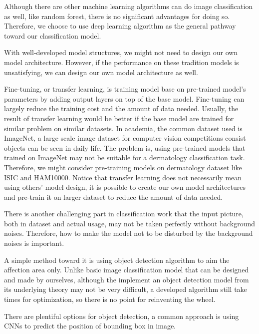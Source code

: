                     Although there are other machine learning algorithms can do image classification as well, like random forest, there is no significant advantages for doing so. Therefore, we choose to use deep learning algorithm as the general pathway toward our classification model.

                    With well-developed model structures, we might not need to design our own model architecture. However, if the performance on these tradition models is unsatisfying, we can design our own model architecture as well.

                    Fine-tuning, or transfer learning, is training model base on pre-trained model's parameters by adding output layers on top of the base model. Fine-tuning can largely reduce the training cost and the amount of data needed. Usually, the result of transfer learning would be better if the base model are trained for similar problem on similar datasets. In academia, the common dataset used is ImageNet\cite{imagenet_cvpr09}, a large scale image dataset for computer vision competitions consist objects can be seen in daily life. The problem is, using pre-trained models that trained on ImageNet may not be suitable for a dermatology classification task. Therefore, we might consider pre-training models on dermatology dataset like ISIC and HAM10000. Notice that transfer learning does not necessarily mean using others' model design, it is possible to create our own model architectures and pre-train it on larger dataset to reduce the amount of data needed.
                    
                    There is another challenging part in classification work that the input picture, both in dataset and actual usage, may not be taken perfectly without background noises. Therefore, how to make the model not to be disturbed by the background noises is important.

                    A simple method toward it is using object detection algorithm to aim the affection area only. Unlike basic image classification model that can be designed and made by ourselves, although the implement an object detection model from its underlying theory may not be very difficult, a developed algorithm still take times for optimization, so there is no point for reinventing the wheel.

                    There are plentiful options for object detection, a common approach is using CNNs to predict the position of bounding box in image.
                    
